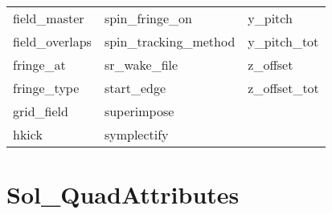 \begin{tabular}{lll}
field_master                & spin_fringe_on              & y_pitch                     \\
field_overlaps              & spin_tracking_method        & y_pitch_tot                 \\
fringe_at                   & sr_wake_file                & z_offset                    \\
fringe_type                 & start_edge                  & z_offset_tot                \\
grid_field                  & superimpose                 &                             \\
hkick                       & symplectify                 &                             \\
 \bottomrule
 \end{tabular}
 \vfill
 
 \section{Sol_QuadAttributes}
 \label{s:list.sol.quad}
 
